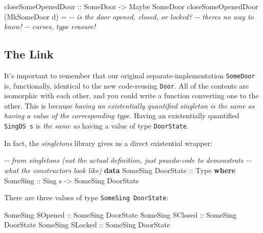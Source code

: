 \documentclass[]{article}
\newenvironment{Shaded}{}{}
\newcommand{\CommentTok}[1]{\textcolor[rgb]{0.38,0.63,0.69}{\textit{#1}}}
\newcommand{\DataTypeTok}[1]{\textcolor[rgb]{0.56,0.13,0.00}{#1}}
\newcommand{\KeywordTok}[1]{\textcolor[rgb]{0.00,0.44,0.13}{\textbf{#1}}}
\newcommand{\NormalTok}[1]{#1}
\newcommand{\OtherTok}[1]{\textcolor[rgb]{0.00,0.44,0.13}{#1}}
\begin{document}
\begin{Shaded}
\begin{Highlighting}[]
\OtherTok{closeSomeOpenedDoor ::} \DataTypeTok{SomeDoor} \OtherTok{{-}\textgreater{}} \DataTypeTok{Maybe} \DataTypeTok{SomeDoor}
\NormalTok{closeSomeOpenedDoor (}\DataTypeTok{MkSomeDoor}\NormalTok{ d) }\OtherTok{=}
            \CommentTok{{-}{-} is the door opened, closed, or locked?}
            \CommentTok{{-}{-} there\textquotesingle{}s no way to know!}
            \CommentTok{{-}{-} curses, type erasure!}
\end{Highlighting}
\end{Shaded}

\subsection{The Link}\label{the-link}

It's important to remember that our original separate-implementation
\texttt{SomeDoor} is, functionally, identical to the new code-reusing
\texttt{Door}. All of the contents are isomorphic with each other, and you could
write a function converting one to the other. This is because \emph{having an
existentially quantified singleton is the same as having a value of the
corresponding type.} Having an existentially quantified \texttt{SingDS\ s} is
\emph{the same as} having a value of type \texttt{DoorState}.

In fact, the \emph{singletons} library gives us a direct existential wrapper:

\begin{Shaded}
\begin{Highlighting}[]
\CommentTok{{-}{-} from singletons (not the actual definition, just psuedo{-}code to demonstrate}
\CommentTok{{-}{-} what the constructors look like)}
\KeywordTok{data} \DataTypeTok{SomeSing} \DataTypeTok{DoorState}\OtherTok{ ::} \DataTypeTok{Type} \KeywordTok{where}
    \DataTypeTok{SomeSing}\OtherTok{ ::} \DataTypeTok{Sing}\NormalTok{ s }\OtherTok{{-}\textgreater{}} \DataTypeTok{SomeSing} \DataTypeTok{DoorState}
\end{Highlighting}
\end{Shaded}

There are three values of type \texttt{SomeSing\ DoorState}:

\begin{Shaded}
\begin{Highlighting}[]
\DataTypeTok{SomeSing} \DataTypeTok{SOpened}\OtherTok{ ::} \DataTypeTok{SomeSing} \DataTypeTok{DoorState}
\DataTypeTok{SomeSing} \DataTypeTok{SClosed}\OtherTok{ ::} \DataTypeTok{SomeSing} \DataTypeTok{DoorState}
\DataTypeTok{SomeSing} \DataTypeTok{SLocked}\OtherTok{ ::} \DataTypeTok{SomeSing} \DataTypeTok{DoorState}
\end{Highlighting}
\end{Shaded}
\end{document}
